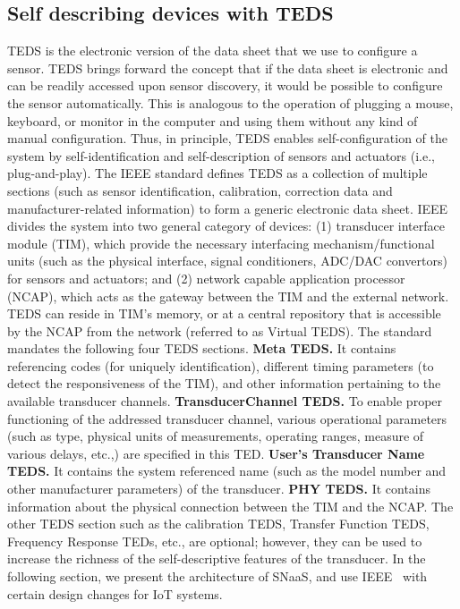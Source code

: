 \documentclass[conference]{IEEEtran}
\begin{document}
\subsection{Self describing devices with TEDS}
TEDS is the electronic version of the data sheet that we use to configure a sensor. 
TEDS brings forward the concept that if the data sheet is electronic and can be readily accessed upon sensor discovery, it would be possible
to configure the sensor automatically. 
This is analogous to the operation of plugging a mouse, keyboard, or monitor in the computer and using them without any kind of manual
configuration.
Thus, in principle, TEDS enables self-configuration of the system by self-identification and self-description of sensors and actuators (i.e., plug-and-play).
\newline
\indent
The IEEE \cite{1451} standard defines TEDS as a collection of multiple sections (such as sensor identification, calibration, correction data and manufacturer-related information) to form a generic electronic data sheet.
IEEE  divides the system into two general category of devices: (1) transducer interface module (TIM), which provide the necessary interfacing mechanism/functional units (such as the physical interface, signal conditioners, ADC/DAC convertors) for sensors and actuators; and (2) network capable application processor (NCAP), which acts as the gateway between the TIM and the external network.
TEDS can reside in TIM's memory, or at a central repository that is accessible by the NCAP from the network (referred to as Virtual TEDS).
The standard mandates the following four TEDS sections.
\vspace{1mm}
\newline
\noindent
 \textbf{Meta TEDS.} It contains referencing codes (for uniquely identification), different timing parameters (to detect the responsiveness of the TIM), and other information pertaining to the available transducer channels.
\vspace{1mm}
\newline
\noindent
 \textbf{TransducerChannel TEDS.} To enable proper functioning of the addressed transducer channel, various operational parameters (such as type, physical units of measurements, operating ranges, measure of various delays, etc.,) are specified in this TED.
\vspace{1mm}
\newline
\noindent
 \textbf{User's Transducer Name TEDS.} It contains the system referenced name (such as the model number and other manufacturer parameters) of the transducer.
\vspace{1mm}
\newline
\noindent
 \textbf{PHY TEDS.} It contains information about the physical connection between the TIM and the NCAP.
\vspace{1mm}
\newline
\noindent
The other TEDS section such as the calibration TEDS, Transfer Function TEDS, Frequency Response TEDs, etc., are optional; however, they can be used to increase the richness of the self-descriptive features of the transducer.
\newline
\indent
In the following section, we present the architecture of SNaaS, and use IEEE~ with certain design changes for IoT systems.
\end{document}
